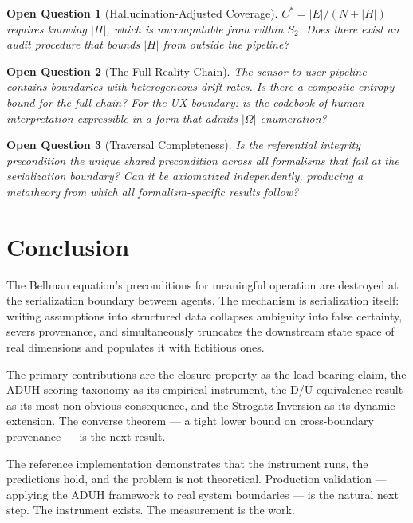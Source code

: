 \documentclass[11pt,a4paper]{article}
\newtheorem{question}{Open Question}
\begin{document}
\begin{question}[Hallucination-Adjusted Coverage]
$C^* = |E| / (N + |H|)$ requires knowing $|H|$, which is 
uncomputable from within $S_2$. Does there exist an audit procedure 
that bounds $|H|$ from outside the pipeline?
\end{question}

\begin{question}[The Full Reality Chain]
The sensor-to-user pipeline contains boundaries with heterogeneous 
drift rates. Is there a composite entropy bound for the full chain? 
For the UX boundary: is the codebook of human interpretation 
expressible in a form that admits $|\Omega|$ enumeration?
\end{question}

\begin{question}[Traversal Completeness]
Is the referential integrity precondition the unique shared 
precondition across all formalisms that fail at the serialization 
boundary? Can it be axiomatized independently, producing a 
metatheory from which all formalism-specific results follow?
\end{question}


\section{Conclusion}

The Bellman equation's preconditions for meaningful operation are 
destroyed at the serialization boundary between agents. The mechanism 
is serialization itself: writing assumptions into structured data 
collapses ambiguity into false certainty, severs provenance, and 
simultaneously truncates the downstream state space of real dimensions 
and populates it with fictitious ones.

The primary contributions are the closure property as the 
load-bearing claim, the ADUH scoring taxonomy as its empirical 
instrument, the D/U equivalence result as its most non-obvious 
consequence, and the Strogatz Inversion as its dynamic extension. 
The converse theorem --- a tight lower bound on cross-boundary 
provenance --- is the next result.

The reference implementation demonstrates that the instrument runs, 
the predictions hold, and the problem is not theoretical. Production 
validation --- applying the ADUH framework to real system boundaries 
--- is the natural next step. The instrument exists. The measurement 
is the work.
\end{document}
